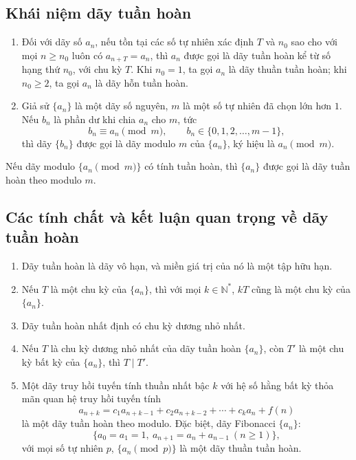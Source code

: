 \documentclass[11pt]{article}
\begin{document}
\subsection{Khái niệm dãy tuần hoàn}

\begin{enumerate}[label=\alph*)]
  \item Đối với dãy số $a_n$, nếu tồn tại các số tự nhiên xác định $T$ và
  $n_0$ sao cho với mọi $n\ge n_0$ luôn có $a_{n+T}=a_n$, thì $a_n$ được gọi
  là dãy tuần hoàn kể từ số hạng thứ $n_0$, với chu kỳ $T$. Khi $n_0=1$, ta
  gọi $a_n$ là dãy thuần tuần hoàn; khi $n_0\ge 2$, ta gọi $a_n$ là dãy hỗn
  tuần hoàn.

  \item Giả sử $\{a_n\}$ là một dãy số nguyên, $m$ là một số tự nhiên đã chọn
  lớn hơn $1$. Nếu $b_n$ là phần dư khi chia $a_n$ cho $m$, tức
  \[
    b_n\equiv a_n \pmod{m},\qquad
    b_n\in\{0,1,2,\ldots,m-1\},
  \]
  thì dãy $\{b_n\}$ được gọi là dãy modulo $m$ của $\{a_n\}$, ký hiệu là
  $a_n \pmod{m}$.
\end{enumerate}

Nếu dãy modulo $\{a_n \pmod{m}\}$ có tính tuần hoàn, thì $\{a_n\}$ được gọi là
dãy tuần hoàn theo modulo $m$.

\subsection{Các tính chất và kết luận quan trọng về dãy tuần hoàn}

\begin{enumerate}[label=\alph*)]
  \item Dãy tuần hoàn là dãy vô hạn, và miền giá trị của nó là một tập hữu hạn.

  \item Nếu $T$ là một chu kỳ của $\{a_n\}$, thì với mọi $k\in\mathbb{N}^{*}$,
  $kT$ cũng là một chu kỳ của $\{a_n\}$.

  \item Dãy tuần hoàn nhất định có chu kỳ dương nhỏ nhất.

  \item Nếu $T$ là chu kỳ dương nhỏ nhất của dãy tuần hoàn $\{a_n\}$, còn
  $T'$ là một chu kỳ bất kỳ của $\{a_n\}$, thì $T\mid T'$.

  \item Một dãy truy hồi tuyến tính thuần nhất bậc $k$ với hệ số hằng bất kỳ
  thỏa mãn quan hệ truy hồi tuyến tính
  \[
    a_{n+k}=c_1a_{n+k-1}+c_2a_{n+k-2}+\cdots+c_ka_n+f(n)
  \]
  là một dãy tuần hoàn theo modulo. Đặc biệt, dãy Fibonacci $\{a_n\}$:
  \[
    \{a_0=a_1=1,\ a_{n+1}=a_n+a_{n-1}\ (n\ge 1)\},
  \]
  với mọi số tự nhiên $p$, $\{a_n \pmod{p}\}$ là một dãy thuần tuần hoàn.
\end{enumerate}
\end{document}
